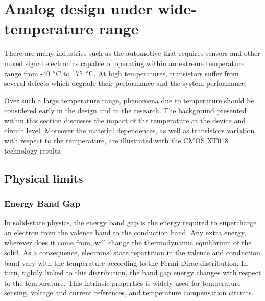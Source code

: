 \section{Analog design under wide-temperature range}
\label{sec:temperature-analogue}

There are many industries such as the automotive that requires sensors and other mixed signal electronics capable of operating within an extreme temperature range from -40 \(\degree \)C to 175 \(\degree \)C. At high temperatures, transistors suffer from several defects which degrade their performance and the system performance.

Over such a large temperature range, phenomena due to temperature should be considered early in the design and in the research. The background presented within this section discusses the impact of the temperature at the device and circuit level. Moreover the material dependences, as well as transistors variation with respect to the temperature, are illustrated with the CMOS XT018 technology results. %
\subsection{Physical limits}


\subsubsection{Energy Band Gap}        %
\label{sec:bandgap}
In solid-state physics, the energy band gap is the energy required to supercharge an electron from the valence band to the conduction band. Any extra energy, wherever does it come from, will change the thermodynamic equilibrium of the solid. As a consequence, electrons' state repartition in the valence and conduction band vary with the temperature according to the Fermi-Dirac distribution. In turn, tightly linked to this distribution, the band gap energy changes with respect to the temperature. This intrinsic properties is widely used for temperature sensing, voltage and current references, and temperature compensation circuits.

